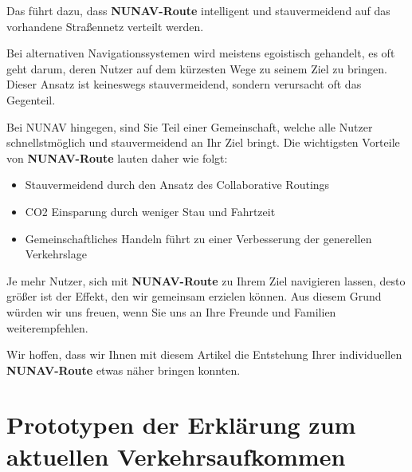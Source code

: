 \smallskip

\noindent Das führt dazu, dass \textbf{NUNAV-Route} intelligent und stauvermeidend auf das vorhandene Straßennetz verteilt werden.

\smallskip

\noindent Bei alternativen Navigationssystemen wird meistens egoistisch gehandelt, es oft geht darum, deren Nutzer auf dem kürzesten Wege zu seinem Ziel zu bringen. Dieser Ansatz ist keineswegs stauvermeidend, sondern verursacht oft das Gegenteil.

\smallskip

\noindent Bei NUNAV hingegen, sind Sie Teil einer Gemeinschaft, welche alle Nutzer schnellstmöglich und stauvermeidend an Ihr Ziel bringt. Die wichtigsten Vorteile von \textbf{NUNAV-Route} lauten daher wie folgt:

\begin{itemize}
    \item Stauvermeidend durch den Ansatz des Collaborative Routings
    \item CO2 Einsparung durch weniger Stau und Fahrtzeit
    \item Gemeinschaftliches Handeln führt zu einer Verbesserung der generellen Verkehrslage
\end{itemize}

\noindent Je mehr Nutzer, sich mit \textbf{NUNAV-Route} zu Ihrem Ziel navigieren lassen, desto größer ist der Effekt, den wir gemeinsam erzielen können. Aus diesem Grund würden wir uns freuen, wenn Sie uns an Ihre Freunde und Familien weiterempfehlen.

\smallskip

\noindent Wir hoffen, dass wir Ihnen mit diesem Artikel die Entstehung Ihrer individuellen \textbf{NUNAV-Route} etwas näher bringen konnten.

\section*{Prototypen der Erklärung zum aktuellen Verkehrsaufkommen}
\label{sec:appendix_traffic_volume}

